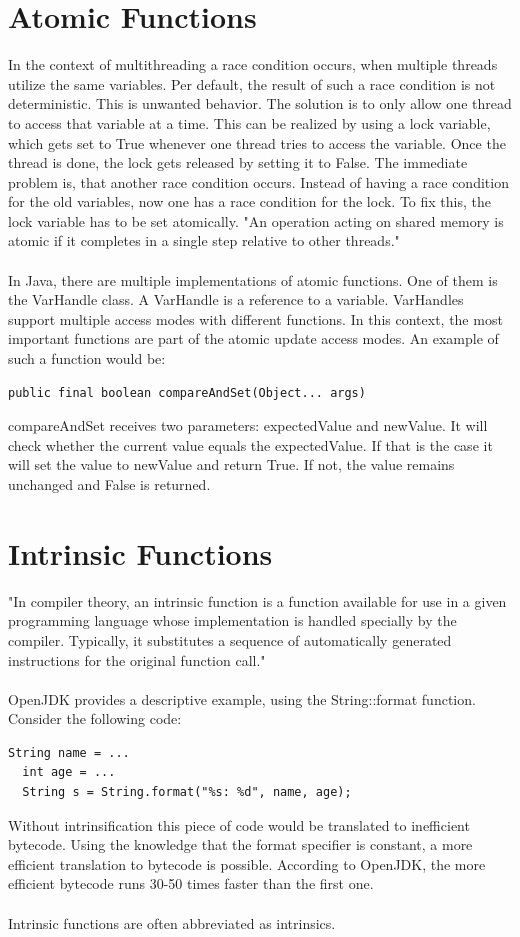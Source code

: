 \section{Atomic Functions}
In the context of multithreading a race condition occurs, when multiple threads utilize the same variables. Per default, the result of such a race condition is not deterministic. This is unwanted behavior. The solution is to only allow one thread to access that variable at a time. This can be realized by using a lock variable, which gets set to True whenever one thread tries to access the variable. Once the thread is done, the lock gets released by setting it to False. The immediate problem is, that another race condition occurs. Instead of having a race condition for the old variables, now one has a race condition for the lock. \cite{Schoettner:bs18:7.4}
To fix this, the lock variable has to be set atomically. "An operation acting on shared memory is atomic if it completes in a single step relative to other threads." \cite{Preshing}
\\
\\
In Java, there are multiple implementations of atomic functions. One of them is the VarHandle class. A VarHandle is a reference to a variable. VarHandles support multiple access modes with different functions. In this context, the most important functions are part of the atomic update access modes. An example of such a function would be:
\begin{lstlisting}[language=custom-java]
  public final boolean compareAndSet(Object... args)
\end{lstlisting}
compareAndSet receives two parameters: expectedValue and newValue. It will check whether the current value equals the expectedValue. If that is the case it will set the value to newValue and return True. If not, the value remains unchanged and False is returned.

\section{Intrinsic Functions}
"In compiler theory, an intrinsic function is a function available for use in a given programming language whose implementation is handled specially by the compiler. Typically, it substitutes a sequence of automatically generated instructions for the original function call." \cite{wiki:intrinsics}
\\
\\
OpenJDK provides a descriptive example, using the String::format function. Consider the following code:
\begin{lstlisting}[language=custom-java]
  String name = ...
  int age = ...
  String s = String.format("%s: %d", name, age);
\end{lstlisting}
Without intrinsification this piece of code would be translated to inefficient bytecode.
Using the knowledge that the format specifier is constant, a more efficient translation to bytecode is possible. According to OpenJDK, the more efficient bytecode runs 30-50 times faster than the first one. \cite{OpenJDK:intrinsics}
\\
\\
Intrinsic functions are often abbreviated as intrinsics.


